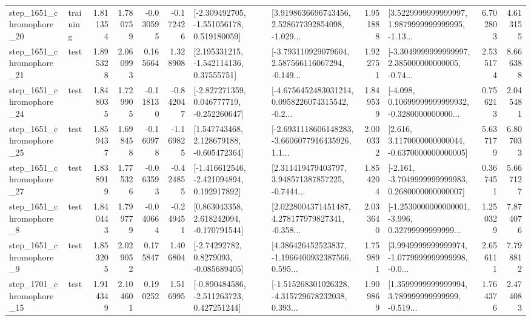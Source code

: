 \begin{tabular}{llrrrrllrlrr}
 step\_1651\_chromophore\_20 &  training &      1.811354 &    1.780759 &     -0.030595 & -0.172426 &   [-2.309492705, -1.551056178, 0.519180059] &  [3.9198636696743456, 2.528677392854098, -1.029... &       1.951888 &  [3.5229999999999997, 1.9879999999999995, -1.13... &            6.702803 &          4.613155 \\
 step\_1651\_chromophore\_21 &      test &      1.895328 &    2.060993 &      0.165664 &  1.328908 &     [2.195331215, -1.542114136, 0.37555751] &  [-3.793110929079604, 2.587566116067294, -0.149... &       1.922751 &  [-3.3049999999999997, 2.385000000000005, -0.74... &            2.535174 &          8.666388 \\
 step\_1651\_chromophore\_24 &      test &      1.848035 &    1.729905 &     -0.118130 & -0.842047 &   [-2.827271359, 0.046777719, -0.252260647] &  [-4.6756452483031214, 0.0958226074315542, -0.2... &       1.849539 &  [-4.098, 0.10699999999999932, -0.3280000000000... &            0.756213 &          2.045481 \\
 step\_1651\_chromophore\_25 &      test &      1.859437 &    1.698458 &     -0.160978 & -1.169825 &    [1.547743468, 2.128679188, -0.605472364] &  [-2.6931118606148283, -3.6606077916435926, 1.1... &       2.000332 &   [2.616, 3.1170000000000044, -0.6370000000000005] &            5.637179 &          6.807033 \\
 step\_1651\_chromophore\_27 &      test &      1.838919 &    1.775326 &     -0.063593 & -0.424855 &   [-1.416612546, -2.421094894, 0.192917892] &  [2.311419479403797, 3.948571387857225, -0.7444... &       1.854204 &  [-2.161, -3.7049999999999983, 0.2680000000000007] &            0.367451 &          5.667127 \\
  step\_1651\_chromophore\_8 &      test &      1.840443 &    1.799779 &     -0.040664 & -0.249451 &    [0.863043358, 2.618242094, -0.170791544] &  [2.0228004371451487, 4.278177979827341, -0.358... &       2.033640 &  [-1.2530000000000001, -3.996, 0.32799999999999... &            1.250329 &          7.874076 \\
  step\_1651\_chromophore\_9 &      test &      1.853205 &    2.029052 &      0.175847 &  1.406804 &      [-2.74292782, 0.8279093, -0.085689405] &  [4.386426452523837, -1.1966400932387566, 0.595... &       1.759891 &  [3.9949999999999974, -1.0779999999999998, -0.0... &            2.656111 &          7.798812 \\
 step\_1701\_chromophore\_15 &      test &      1.914349 &    2.104601 &      0.190252 &  1.516995 &   [-0.890484586, -2.511263723, 0.427251244] &  [-1.515268301026328, -4.315729678232038, 0.393... &       1.909869 &  [1.3599999999999994, 3.789999999999999, -0.519... &            1.764376 &          2.474083 \\

\end{tabular}
